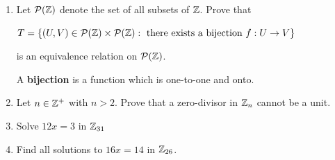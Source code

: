 \documentclass[11pt,fleqn,dvipsnames,usenames]{article}
\begin{document}
\begin{enumerate}
\item Let $\mathcal{P}(\mathbb{Z})$ denote the set of all subsets of $\mathbb{Z}$.  Prove that
\begin{center}
$T = \left\{(U,V)\in \mathcal{P}(\mathbb{Z})\times\mathcal{P}(\mathbb{Z}):\text{ there exists a bijection }f:U\to V\right\}$
\end{center}
is an equivalence relation on $\mathcal{P}(\mathbb{Z})$.
\vsmsp

\recall A \textbf{bijection} is a function which is one-to-one and onto.

\item Let $n\in\mathbb{Z}^+$ with $n > 2$.  Prove that a zero-divisor in $\mathbb{Z}_n$ cannot be a unit.
\item Solve $12x = 3$ in $\mathbb{Z}_{31}$
\item Find all solutions to $16x = 14$ in $\mathbb{Z}_{26}$.
\end{enumerate}
\end{document}
